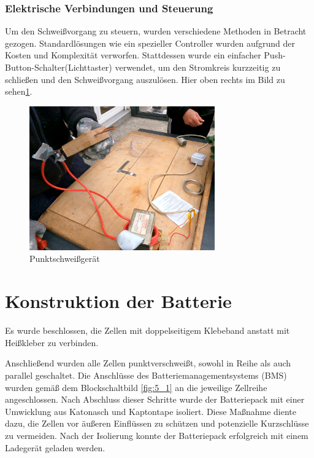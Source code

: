 \subsubsection*{Elektrische Verbindungen und Steuerung}
Um den Schweißvorgang zu steuern, wurden verschiedene Methoden in Betracht gezogen.
Standardlösungen wie ein spezieller Controller wurden aufgrund der Kosten und Komplexität verworfen.
Stattdessen wurde ein einfacher Push-Button-Schalter(Lichttaster) verwendet, um den Stromkreis kurzzeitig zu schließen und den Schweißvorgang auszulösen.
Hier oben rechts im Bild zu sehen\ref{fig:22}.


\begin{figure}[ht]
    \centering
    \includegraphics[width=8cm]{images/Transformator und Punktschweißgerät}
    \caption{ Punktschweißgerät\cite{lorenz_scherrer_selbst_2023}}
    \label{fig:22}
\end{figure}












\section{Konstruktion der Batterie}

Es wurde beschlossen, die Zellen mit doppelseitigem Klebeband anstatt mit Heißkleber zu verbinden.


Anschließend wurden alle Zellen punktverschweißt, sowohl in Reihe als auch parallel geschaltet.
Die Anschlüsse des Batteriemanagementsystems (BMS) wurden gemäß dem Blockschaltbild \ref{fig:5_1} an die jeweilige Zellreihe angeschlossen.
Nach Abschluss dieser Schritte wurde der Batteriepack mit einer Umwicklung aus Katonasch und Kaptontape isoliert.
Diese Maßnahme diente dazu, die Zellen vor äußeren Einflüssen zu schützen und potenzielle Kurzschlüsse zu vermeiden.
Nach der Isolierung konnte der Batteriepack erfolgreich mit einem Ladegerät geladen werden.


